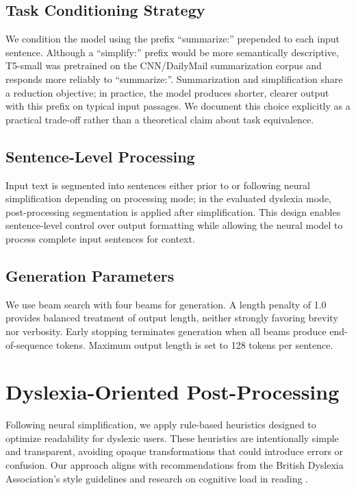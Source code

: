 \documentclass[11pt]{article}
\begin{document}
\subsection{Task Conditioning Strategy}

We condition the model using the prefix ``summarize:'' prepended to each input sentence. Although a ``simplify:'' prefix would be more semantically descriptive, T5-small was pretrained on the CNN/DailyMail summarization corpus and responds more reliably to ``summarize:''. Summarization and simplification share a reduction objective; in practice, the model produces shorter, clearer output with this prefix on typical input passages. We document this choice explicitly as a practical trade-off rather than a theoretical claim about task equivalence.

\subsection{Sentence-Level Processing}

Input text is segmented into sentences either prior to or following neural simplification depending on processing mode; in the evaluated dyslexia mode, post-processing segmentation is applied after simplification. This design enables sentence-level control over output formatting while allowing the neural model to process complete input sentences for context.

\subsection{Generation Parameters}

We use beam search with four beams for generation. A length penalty of 1.0 provides balanced treatment of output length, neither strongly favoring brevity nor verbosity. Early stopping terminates generation when all beams produce end-of-sequence tokens. Maximum output length is set to 128 tokens per sentence.

\section{Dyslexia-Oriented Post-Processing}

Following neural simplification, we apply rule-based heuristics designed to optimize readability for dyslexic users. These heuristics are intentionally simple and transparent, avoiding opaque transformations that could introduce errors or confusion. Our approach aligns with recommendations from the British Dyslexia Association's style guidelines \citep{bda2023} and research on cognitive load in reading \citep{snowling2000}.
\end{document}
